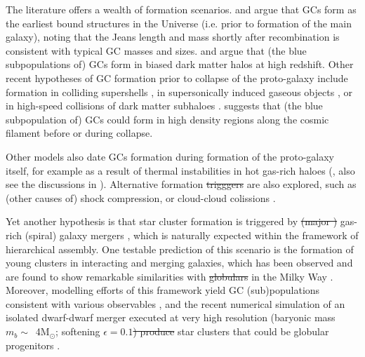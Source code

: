 \documentclass[a4paper,fleqn,usenatbib]{mnras}
\newcommand{\Sun}[0]{\ensuremath{_{\odot}}}
\providecommand{\DIFadd}[1]{{\protect\color{blue}\uwave{#1}}} %
\providecommand{\DIFdel}[1]{{\protect\color{red}\sout{#1}}}                      %
\providecommand{\DIFaddbegin}{} %
\providecommand{\DIFaddend}{} %
\providecommand{\DIFdelbegin}{} %
\providecommand{\DIFdelend}{} %
\newcommand{\DIFscaledelfig}{0.5}
\newlength{\DIFdelgraphicswidth} %
\newlength{\DIFdelgraphicsheight} %
\newcommand{\DIFaddincludegraphics}[2][]{{\color{blue}\fbox{\DIFOincludegraphics[#1]{#2}}}} %
\newcommand{\DIFdelincludegraphics}[2][]{%
\sbox{\DIFdelgraphicsbox}{\DIFOincludegraphics[#1]{#2}}%
\settoboxwidth{\DIFdelgraphicswidth}{\DIFdelgraphicsbox} %
\settoboxtotalheight{\DIFdelgraphicsheight}{\DIFdelgraphicsbox} %
\scalebox{\DIFscaledelfig}{%
\parbox[b]{\DIFdelgraphicswidth}{\usebox{\DIFdelgraphicsbox}\\[-\baselineskip] \rule{\DIFdelgraphicswidth}{0em}}\llap{\resizebox{\DIFdelgraphicswidth}{\DIFdelgraphicsheight}{%
\setlength{\unitlength}{\DIFdelgraphicswidth}%
\begin{picture}(1,1)%
\thicklines\linethickness{2pt} %
{\color[rgb]{1,0,0}\put(0,0){\framebox(1,1){}}}%
{\color[rgb]{1,0,0}\put(0,0){\line( 1,1){1}}}%
{\color[rgb]{1,0,0}\put(0,1){\line(1,-1){1}}}%
\end{picture}%
}\hspace*{3pt}}} %
} %
\DeclareRobustCommand{\DIFaddbegin}{\DIFOaddbegin \let\includegraphics\DIFaddincludegraphics} %
\DeclareRobustCommand{\DIFaddend}{\DIFOaddend \let\includegraphics\DIFOincludegraphics} %
\DeclareRobustCommand{\DIFdelbegin}{\DIFOdelbegin \let\includegraphics\DIFdelincludegraphics} %
\DeclareRobustCommand{\DIFdelend}{\DIFOaddend \let\includegraphics\DIFOincludegraphics} %
\begin{document}
The literature offers a wealth of formation scenarios. \citet{1968ApJ...154..891P}
and \citet{1984ApJ...277..470P} argue that GCs form as the earliest bound
structures in the Universe (i.e. prior to formation of the main galaxy), 
noting that the Jeans length and mass shortly after recombination is consistent
with typical GC masses and sizes. \citet{2005MNRAS.364..367D} and \citet{
2009ApJ...706L.192B} argue that (the blue subpopulations of) GCs form in \DIFaddbegin \DIFadd{radially
}\DIFaddend biased dark matter halos at high redshift. Other recent hypotheses of GC formation 
prior to collapse of the proto-galaxy include formation in colliding supershells 
\citep{2017Ap&SS.362..183R}, in supersonically induced gaseous objects
\citep{2019arXiv190408941C}, or in high-speed collisions of dark matter subhaloes
\citep{2019arXiv190508951M}. \citet{2017MNRAS.472.3120B} suggests
that (the blue subpopulation of) GCs could form in high density regions along
the cosmic filament before or during collapse.

Other models also date GCs formation during formation of the proto-galaxy itself,
for example as a result of thermal instabilities in hot gas-rich haloes 
(\citealt{1985ApJ...298...18F}, also see the discussions in \citealt{
1990ApJ...363..488K}). Alternative formation \DIFdelbegin \DIFdel{trigggers }\DIFdelend \DIFaddbegin \DIFadd{triggers }\DIFaddend are also explored, such as 
(other causes of) shock compression, or cloud-cloud colissions \citep[e.g.][]{
1980glcl.conf..301G, 1992ApJ...400..265M, 1994ApJ...429..177H, 1995ApJ...442..618V,
1996ASPC...92..241L, 2001ApJ...560..592C}. 

Yet another hypothesis is that star cluster formation is triggered by \DIFdelbegin \DIFdel{(major 
) 
}\DIFdelend \DIFaddbegin \DIFadd{major 
}\DIFaddend gas-rich (spiral) galaxy mergers \citep{1987nngp.proc...18S, 1992ApJ...384...50A},
which is naturally expected within the framework of hierarchical assembly. One
testable prediction of this scenario is the formation of young clusters in
interacting and merging galaxies, which has been observed and are found to show 
remarkable similarities with \DIFdelbegin \DIFdel{globulars }\DIFdelend \DIFaddbegin \DIFadd{GCs }\DIFaddend in the Milky Way \citep[e.g.][]{
1995AJ....109..960W, 1996AJ....112..416H, 1999AJ....118..752Z, 1999AJ....118.1551W}.
Moreover, modelling efforts of this framework yield GC (sub)populations consistent 
with various observables \citep[e.g.][]{2010ApJ...718.1266M, 2018MNRAS.480.2343C}, 
and the recent numerical simulation of an isolated dwarf-dwarf merger executed at 
very high resolution (baryonic mass $m_b \sim$~4M\Sun; softening $\epsilon = 0.1$\DIFdelbegin \DIFdel{) 
produce }\DIFdelend \DIFaddbegin \DIFadd{~pc) 
produces }\DIFaddend star clusters that could be globular progenitors \citep{
2019arXiv190509840L}.
\end{document}
